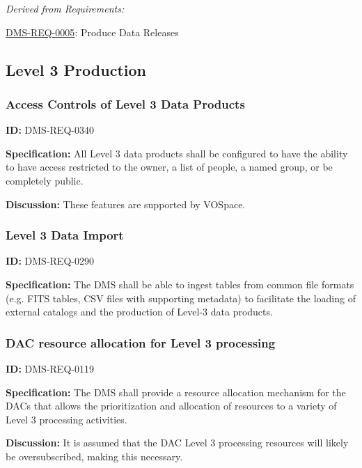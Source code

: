 \documentclass[SE,toc,lsstdraft]{lsstdoc}
\begin{document}
\emph{Derived from Requirements:}

\hyperref[DMS-REQ-0005]{DMS-REQ-0005}:
Produce Data Releases \newline


\subsection{Level 3 Production}





\subsubsection{Access Controls of Level 3 Data Products}

\label{DMS-REQ-0340}
\textbf{ID:} DMS-REQ-0340

\textbf{Specification:} All Level 3 data products shall be configured to have the ability to have access restricted to the owner, a list of people, a named group, or be completely public.

\textbf{Discussion:} These features are supported by VOSpace.





\subsubsection{Level 3 Data Import}

\label{DMS-REQ-0290}
\textbf{ID:} DMS-REQ-0290

\textbf{Specification:} The DMS shall be able to ingest tables from common file formats (e.g. FITS tables, CSV files with supporting metadata) to facilitate the loading of external catalogs and the production of Level-3 data products.






\subsubsection{DAC resource allocation for Level 3 processing}

\label{DMS-REQ-0119}
\textbf{ID:} DMS-REQ-0119

\textbf{Specification:} The DMS shall provide a resource allocation mechanism for the DACs that allows the prioritization and allocation of resources to a variety of Level 3 processing activities.

\textbf{Discussion:} It is assumed that the DAC Level 3 processing resources will likely be oversubscribed, making this necessary.
\end{document}
